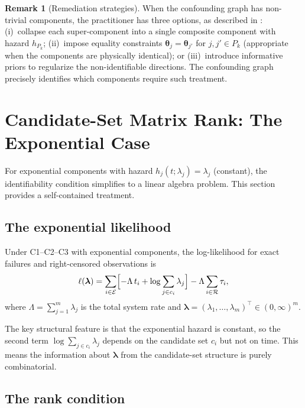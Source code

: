 \documentclass[11pt]{article}
\theoremstyle{definition}
\newtheorem{remark}{Remark}
\theoremstyle{plain}
\renewcommand{\v}[1]{\boldsymbol{#1}}
\begin{document}
\begin{remark}[Remediation strategies]
\label{rem:remediation}
When the confounding graph has non-trivial components, the
practitioner has three options, as described in
\citet{towell2025masked}:
(i)~collapse each super-component into a single composite component
with hazard $h_{P_k}$;
(ii)~impose equality constraints
$\v{\theta}_j = \v{\theta}_{j'}$ for $j, j' \in P_k$ (appropriate
when the components are physically identical); or
(iii)~introduce informative priors to regularize the non-identifiable
directions.
The confounding graph precisely identifies which components require
such treatment.
\end{remark}


\section{Candidate-Set Matrix Rank: The Exponential Case}
\label{sec:rank-condition}

For exponential components with hazard $h_j(t; \lambda_j) = \lambda_j$
(constant), the identifiability condition simplifies to a linear
algebra problem.
This section provides a self-contained treatment.

\subsection{The exponential likelihood}

Under C1--C2--C3 with exponential components, the log-likelihood
for exact failures and right-censored observations is
\begin{equation}
\label{eq:expo-loglik}
    \ell(\v{\lambda})
    = \sum_{i \in \mathcal{E}} \Bigl[
        -\Lambda \, t_i + \log \sum_{j \in c_i} \lambda_j
    \Bigr]
    - \Lambda \sum_{i \in \mathcal{R}} \tau_i,
\end{equation}
where $\Lambda = \sum_{j=1}^m \lambda_j$ is the total system rate
and $\v{\lambda} = (\lambda_1, \ldots, \lambda_m)^\top \in (0,\infty)^m$.

The key structural feature is that the exponential hazard is constant,
so the second term $\log \sum_{j \in c_i} \lambda_j$ depends on the
candidate set $c_i$ but not on time.
This means the information about $\v{\lambda}$ from the candidate-set
structure is purely combinatorial.

\subsection{The rank condition}
\end{document}
